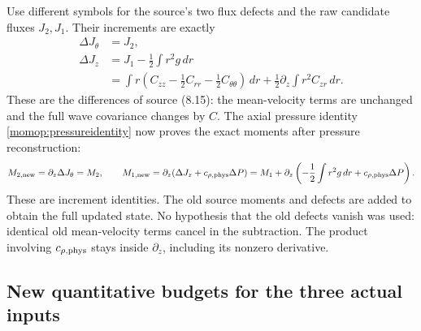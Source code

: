 \documentclass[11pt]{article}
\begin{document}
Use different symbols for the source's two flux defects and the raw
candidate fluxes $J_2,J_1$. Their increments are exactly
\begin{align}
 \Delta J_\theta&=J_2,\nonumber\\
 \Delta J_z&=J_1-\frac12\int r^2g\,dr\nonumber\\
 &=\int r\left(C_{zz}-\frac12C_{rr}
                         -\frac12C_{\theta\theta}\right)\,dr
                    +\frac12\partial_z\int r^2C_{zr}\,dr .
 \label{momop:defectdictionary}
\end{align}
These are the differences of source (8.15): the mean-velocity terms
are unchanged and the full wave covariance changes by $C$.
The axial pressure identity \eqref{momop:pressureidentity} now proves
the exact moments after pressure reconstruction:
\begin{equation}\label{momop:afterpressure}
 M_{2,\rm new}=\partial_z\Delta J_\theta=M_2,\qquad
 M_{1,\rm new}=\partial_z(\Delta J_z+c_{\rho,\rm phys}\Delta P)
  =M_1+\partial_z\left(-\frac12\int r^2g\,dr
                                      +c_{\rho,\rm phys}\Delta P\right).
\end{equation}
These are increment identities. The old source moments and defects
are added to obtain the full updated state. No hypothesis that the
old defects vanish was used: identical old mean-velocity terms
cancel in the subtraction. The product involving $c_{\rho,\rm phys}$
stays inside $\partial_z$, including its nonzero derivative.

\subsection{New quantitative budgets for the three actual inputs}
\end{document}
